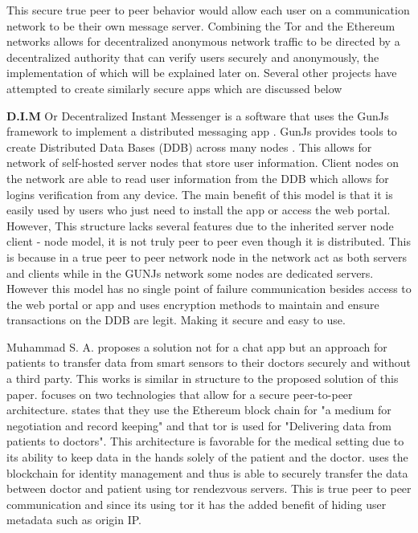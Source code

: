 \documentclass[../main/main.tex]{subfiles}
\begin{document}
This secure true peer to peer behavior would allow each user on a communication network to be their own message server.
Combining the Tor and the Ethereum networks allows for decentralized anonymous network traffic to be directed by a decentralized authority that can verify users securely and anonymously, the implementation of which will be explained later on.
Several other projects have attempted to create similarly secure apps which are discussed below

\textbf{D.I.M} Or Decentralized Instant Messenger is a software that uses the GunJs framework to implement a distributed messaging app \cite{DIM}. %
GunJs provides tools to create Distributed Data Bases (DDB) across many nodes \cite{DIM}. 
This allows for network of self-hosted server nodes that store user information. 
Client nodes on the network are able to read user information from the DDB which allows for logins verification from any device. 
The main benefit of this model is that it is easily used by users who just need to install the app or access the web portal.
However, This structure lacks several features due to the inherited server node client - node model, it is not truly peer to peer even though it is distributed. 
This is because in a true peer to peer network node in the network act as both servers and clients \cite{P2P} while in the GUNJs network some nodes are dedicated servers. 
However this model has no single point of failure communication besides access to the web portal or app and uses encryption methods to maintain and ensure transactions on the DDB are legit. 
Making it secure and easy to use. 


Muhammad S. A.\cite{SENSE} proposes a solution not for a chat app but an approach for patients to transfer data from smart sensors to their doctors securely and without a third party. 
This works is similar in structure to the proposed solution of this paper. 
\cite{SENSE} focuses on two technologies that allow for a secure peer-to-peer architecture. 
\cite{SENSE} states that they use the Ethereum block chain for "a medium for negotiation and record keeping" and that tor is used for "Delivering data from patients to doctors".
This architecture is favorable for the medical setting due to its ability to keep data in the hands solely  of the patient and the doctor. 
\cite{SENSE} uses the blockchain for identity management and thus is able to securely transfer the data between doctor and patient using tor rendezvous servers.  
This is true peer to peer communication and since its using tor it has the added benefit of hiding user metadata such as origin IP. 
\end{document}
